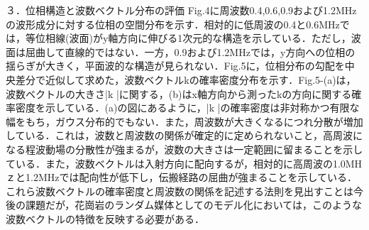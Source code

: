 ３．位相構造と波数ベクトル分布の評価
Fig.4に周波数0.4,0.6,0.9および1.2MHzの波形成分に対する位相の空間分布を示す．相対的に低周波の0.4と0.6MHzでは，等位相線(波面)がy軸方向に伸びる1次元的な構造を示している．ただし，波面は屈曲して直線的ではない．一方，0.9および1.2MHzでは，y方向への位相の揺らぎが大きく，平面波的な構造が見られない．Fig.5に，位相分布の勾配を中央差分で近似して求めた，波数ベクトルkの確率密度分布を示す．Fig.5-(a)は，波数ベクトルの大きさ|k |に関する，(b)はx軸方向から測ったkの方向に関する確率密度を示している．(a)の図にあるように，|k |の確率密度は非対称かつ有限な幅をもち，ガウス分布的でもない．また，周波数が大きくなるにつれ分散が増加している．これは，波数と周波数の関係が確定的に定められないこと，高周波になる程波動場の分散性が強まるが，波数の大きさは一定範囲に留まることを示している．また，波数ベクトルは入射方向に配向するが，相対的に高周波の1.0MHｚと1.2MHzでは配向性が低下し，伝搬経路の屈曲が強まることを示している．これら波数ベクトルの確率密度と周波数の関係を記述する法則を見出すことは今後の課題だが，花崗岩のランダム媒体としてのモデル化においては，このような波数ベクトルの特徴を反映する必要がある．

